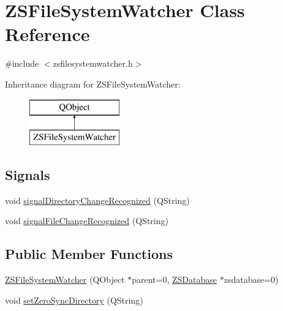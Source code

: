 \hypertarget{class_z_s_file_system_watcher}{\section{Z\-S\-File\-System\-Watcher Class Reference}
\label{class_z_s_file_system_watcher}
}


{\ttfamily \#include $<$zsfilesystemwatcher.\-h$>$}

Inheritance diagram for Z\-S\-File\-System\-Watcher\-:\begin{figure}[H]
\begin{center}
\leavevmode
\includegraphics[height=2.000000cm]{class_z_s_file_system_watcher}
\end{center}
\end{figure}
\subsection*{Signals}
\begin{DoxyCompactItemize}
\item 
void \hyperlink{class_z_s_file_system_watcher_a480eedeb0d335cf692c002b710c3c94b}{signal\-Directory\-Change\-Recognized} (Q\-String)
\item 
void \hyperlink{class_z_s_file_system_watcher_a118b7f9b6356b07729ad2167921da4fd}{signal\-File\-Change\-Recognized} (Q\-String)
\end{DoxyCompactItemize}
\subsection*{Public Member Functions}
\begin{DoxyCompactItemize}
\item 
\hyperlink{class_z_s_file_system_watcher_a1d28ccc55263ad5af3155bad1048bf7d}{Z\-S\-File\-System\-Watcher} (Q\-Object $\ast$parent=0, \hyperlink{class_z_s_database}{Z\-S\-Database} $\ast$zsdatabase=0)
\item 
void \hyperlink{class_z_s_file_system_watcher_a99a18ceeab7e24dc79a7cd00003691c6}{set\-Zero\-Sync\-Directory} (Q\-String)
\end{DoxyCompactItemize}


